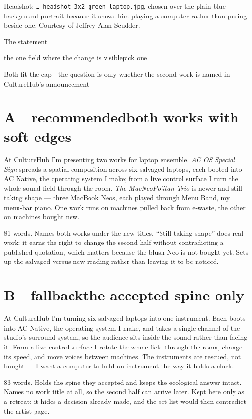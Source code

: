 \documentclass[10pt,letterpaper]{article}
\newcommand{\quoteblock}[2]{%
  \begingroup
  \setlength{\fboxsep}{10pt}%
  \noindent\colorbox{acpale}{%
    \begin{minipage}{\dimexpr\linewidth-2\fboxsep\relax}
    \fontsize{10.6pt}{13.6pt}\selectfont\color{acdark}#1
    \par\vspace{0.5em}
    {\fontsize{8.6pt}{10pt}\selectfont\color{acgray}#2}
    \end{minipage}}%
  \endgroup\par\vspace{0.5em}}
\newcommand{\dsep}{{\normalfont\;\textperiodcentered\;}}
\newcommand{\ddash}{{\normalfont\;---\;}}
\renewcommand{\pageclaim}[1]{%
  {\hyphenpenalty=10000\exhyphenpenalty=10000\RaggedRight
   \aclight\fontsize{12.5pt}{15pt}\selectfont\color{acpink}#1\par}\vspace{0.18em}}
\renewcommand{\credit}[1]{{\fontsize{7.8pt}{9.4pt}\selectfont\color{acgray}#1\par}}
\newcommand{\midtitle}[2]{%
  \vspace{0.5em}{\color{acpink}\rule{\linewidth}{1pt}}\par\vspace{0.28em}%
  {\acbold\fontsize{18pt}{20pt}\selectfont\color{acdark}#1\par}%
  {\hyphenpenalty=10000\exhyphenpenalty=10000\RaggedRight
   \aclight\fontsize{10.5pt}{12.5pt}\selectfont\color{acpink}#2\par}\vspace{0.2em}}
\begin{document}
\credit{Headshot: \texttt{…-headshot-3x2-green-laptop.jpg}, chosen over the
plain blue-background portrait because it shows him playing a computer rather
than posing beside one. Courtesy of Jeffrey Alan Scudder.}

\midtitle{The statement}{the one field where the change is visible\dsep pick one}

\pageclaim{Both fit the cap\ddash the question is only whether the second work
is named in CultureHub's announcement}

\section{A\ddash recommended\dsep both works with soft edges}
\quoteblock{At CultureHub I'm presenting two works for laptop ensemble.
\emph{AC OS Special Sign} spreads a spatial composition across six salvaged
laptops, each booted into AC Native, the operating system I make; from a live
control surface I turn the whole sound field through the room. \emph{The
MacNeoPolitan Trio} is newer and still taking shape — three MacBook Neos, each
played through Menu Band, my menu-bar piano. One work runs on machines pulled
back from e-waste, the other on machines bought new.}%
{81 words. Names both works under the new titles. ``Still taking shape'' does real work:
it earns the right to change the second half without contradicting a published
quotation, which matters because the blush Neo is not bought yet. Sets up the
salvaged-versus-new reading rather than leaving it to be noticed.}

\section{B\ddash fallback\dsep the accepted spine only}
\quoteblock{At CultureHub I'm turning six salvaged laptops into one instrument.
Each boots into AC Native, the operating system I make, and takes a single
channel of the studio's surround system, so the audience sits inside the sound
rather than facing it. From a live control surface I rotate the whole field
through the room, change its speed, and move voices between machines. The
instruments are rescued, not bought — I want a computer to hold an instrument
the way it holds a clock.}%
{83 words. Holds the spine they accepted and keeps the ecological answer
intact. Names no work title at all, so the second half can arrive later. Kept
here only as a retreat: it hides a decision already made, and the set list would
then contradict the artist page.}
\end{document}
